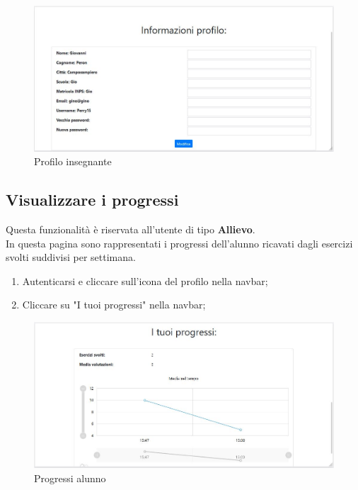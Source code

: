 \documentclass[11pt,a4paper]{article}
\begin{document}
{	\begin{figure}[h]
		\centering
		\includegraphics[scale=0.65]{images/profiloinsegnante.jpg}
		\caption{Profilo insegnante}
	\end{figure}
	
	\newpage
	\subsection{Visualizzare i progressi}
	Questa funzionalità è riservata all'utente di tipo \textbf{Allievo}.\\
	In questa pagina sono rappresentati i progressi dell'alunno ricavati dagli esercizi svolti suddivisi per settimana.
	
	\begin{enumerate}
		\item Autenticarsi e cliccare sull'icona del profilo nella navbar;
		\item Cliccare su "I tuoi progressi" nella navbar;
	\end{enumerate}

	\begin{figure}[h]
		\centering
		\includegraphics[scale=0.65]{images/progressi.jpg}
		\caption{Progressi alunno}
	\end{figure}	
	
}
\end{document}
